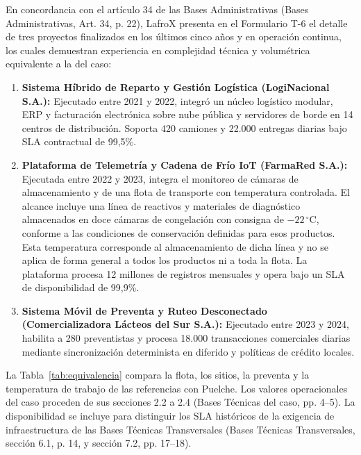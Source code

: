 En concordancia con el artículo 34 de las Bases Administrativas (Bases Administrativas, Art. 34, p. 22), LafroX presenta en el Formulario T-6 el detalle de tres proyectos finalizados en los últimos cinco años y en operación continua, los cuales demuestran experiencia en complejidad técnica y volumétrica equivalente a la del caso:
\begin{enumerate}
    \item \textbf{Sistema Híbrido de Reparto y Gestión Logística (LogiNacional S.A.):} Ejecutado entre 2021 y 2022, integró un núcleo logístico modular, ERP y facturación electrónica sobre nube pública y servidores de borde en 14 centros de distribución. Soporta 420 camiones y 22.000 entregas diarias bajo SLA contractual de 99,5\%.
    \item \textbf{Plataforma de Telemetría y Cadena de Frío IoT (FarmaRed S.A.):} Ejecutada entre 2022 y 2023, integra el monitoreo de cámaras de almacenamiento y de una flota de transporte con temperatura controlada. El alcance incluye una línea de reactivos y materiales de diagnóstico almacenados en doce cámaras de congelación con consigna de $-22\,^{\circ}\mathrm{C}$, conforme a las condiciones de conservación definidas para esos productos. Esta temperatura corresponde al almacenamiento de dicha línea y no se aplica de forma general a todos los productos ni a toda la flota. La plataforma procesa 12 millones de registros mensuales y opera bajo un SLA de disponibilidad de 99,9\%.
    \item \textbf{Sistema Móvil de Preventa y Ruteo Desconectado (Comercializadora Lácteos del Sur S.A.):} Ejecutado entre 2023 y 2024, habilita a 280 preventistas y procesa 18.000 transacciones comerciales diarias mediante sincronización determinista en diferido y políticas de crédito locales.
\end{enumerate}

La Tabla~\ref{tab:equivalencia} compara la flota, los sitios, la preventa y la temperatura de trabajo de las referencias con Puelche. Los valores operacionales del caso proceden de sus secciones 2.2 a 2.4 (Bases Técnicas del caso, pp. 4–5). La disponibilidad se incluye para distinguir los SLA históricos de la exigencia de infraestructura de las Bases Técnicas Transversales (Bases Técnicas Transversales, sección 6.1, p. 14, y sección 7.2, pp. 17–18).

